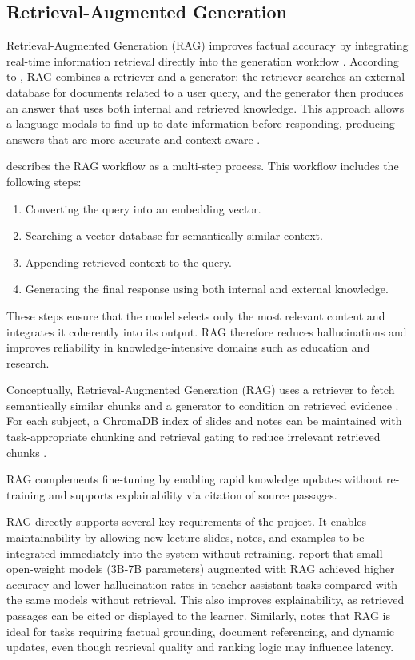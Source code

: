 \subsection{Retrieval-Augmented Generation}
Retrieval-Augmented Generation (RAG) improves factual accuracy by integrating real-time information retrieval directly into the generation workflow \parencite{RAGvsCAG99:online}. According to \parencite{RAGvsCAG95:online}, RAG combines a retriever and a generator: the retriever searches an external database for documents related to a user query, and the generator then produces an answer that uses both internal and retrieved knowledge. This approach allows a language modals to find up-to-date information before responding, producing answers that are more accurate and context-aware \parencite{RAGvsCAG99:online, 2506059250:online, WhatisRe45:online}.

\parencite{RAGvsCAG99:online, WhatisRe45:online} describes the RAG workflow as a multi-step process. This workflow includes the following steps:
\begin{enumerate}
\item Converting the query into an embedding vector.
\item Searching a vector database for semantically similar context.
\item Appending retrieved context to the query.
\item Generating the final response using both internal and external knowledge.
\end{enumerate} 
These steps ensure that the model selects only the most relevant content and integrates it coherently into its output. RAG therefore reduces hallucinations and improves reliability in knowledge-intensive domains such as education and research.

Conceptually, Retrieval-Augmented Generation (RAG) uses a retriever to fetch semantically similar chunks and a generator to condition on retrieved evidence \parencite{2005114070:online,WhatisRe45:online}. For each subject, a ChromaDB index of slides and notes can be maintained with task-appropriate chunking and retrieval gating to reduce irrelevant retrieved chunks \parencite{ChromaDB63:online}.

RAG complements fine-tuning by enabling rapid knowledge updates without re-training and supports explainability via citation of source passages.

RAG directly supports several key requirements of the project. It enables maintainability by allowing new lecture slides, notes, and examples to be integrated immediately into the system without retraining.  \parencite{2506059250:online} report that small open-weight models (3B-7B parameters) augmented with RAG achieved higher accuracy and lower hallucination rates in teacher-assistant tasks compared with the same models without retrieval. This also improves explainability, as retrieved passages can be cited or displayed to the learner.  Similarly, \parencite{RAGvsCAG99:online} notes that RAG is ideal for tasks requiring factual grounding, document referencing, and dynamic updates, even though retrieval quality and ranking logic may influence latency.

